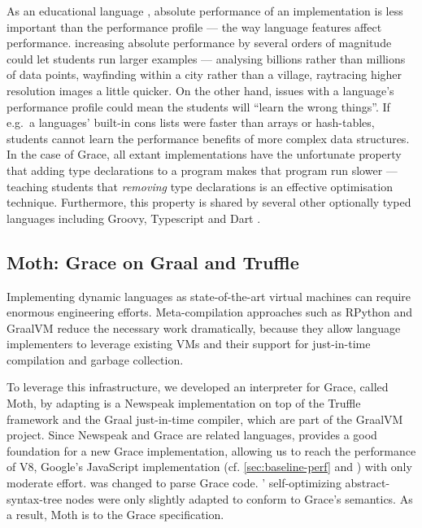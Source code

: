 As an educational language \cite{panel}, absolute performance of an
implementation is less important than the performance profile --- the
way language features affect performance.  increasing absolute
performance by several orders of magnitude could let students run
larger examples --- analysing billions rather than millions of data
points, wayfinding within a city rather than a village, raytracing
higher resolution images a little quicker.  On the other hand, issues
with a language's performance profile could mean the students will
``learn the wrong things''.  If e.g.\ a languages' built-in cons lists
were faster than arrays or hash-tables, students cannot learn the
performance benefits of more complex data structures. In the case of
Grace, all extant implementations have the unfortunate property that
adding type declarations to a program makes that program run slower
--- teaching students that \emph{removing} type declarations is an
effective optimisation technique.  Furthermore, this property is shared
by several other optionally typed languages including Groovy,
Typescript and Dart \cite{Muehlboeck2017,find-who-says-this-and-cite-them}.


\subsection{Moth: Grace on Graal and Truffle}
\label{ssec:moth}

Implementing dynamic languages as state-of-the-art virtual machines
can require enormous engineering efforts.
Meta-compilation approaches\citep{Marr:2015:MTPE}
such as RPython\citep{Bolz:2009:TMP,Bolz:2013:IMT}
and GraalVM\citep{Wurthinger2013,Wurthinger:2017:PPE}
reduce the necessary work dramatically,
because they allow language implementers to leverage existing VMs
and their support for just-in-time compilation and garbage collection.

To leverage this infrastructure, we developed an interpreter for Grace,
called Moth\citep{Roberts2017}, by adapting
\SOMns is a Newspeak implementation\citep{Bracha:10:NS} on top of the Truffle framework and the Graal just-in-time compiler,
which are part of the GraalVM project.
Since Newspeak and Grace are related languages,
\SOMns provides a good foundation for a new Grace implementation,
allowing us to reach the performance of V8,
Google's JavaScript implementation
(cf. \cref{sec:baseline-perf} and \citet{Marr2016})
with only moderate effort.
\SOMns was changed to parse Grace code.
\SOMns' self-optimizing abstract-syntax-tree nodes were only slightly adapted to conform to Grace's semantics.
As a result, Moth is  to the Grace specification.


